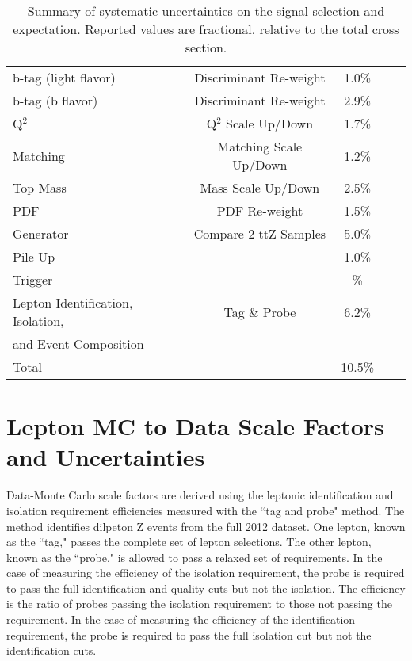 \begin{table}[h]
\begin{center}
\begin{tabular}{lcccc}
b-tag (light flavor)                          & Discriminant Re-weight                              & 1.0\%       	\\
b-tag (b flavor)		                      & Discriminant Re-weight                              & 2.9\%	\\	
Q$^2$                                         & Q$^2$ Scale Up/Down                                 & 1.7\% \\
Matching                                      & Matching Scale Up/Down                              & 1.2\% \\
Top Mass                                      & Mass Scale Up/Down                                  & 2.5\% \\
PDF				                              & PDF Re-weight                                       & 1.5\%	\\
Generator                                     & Compare 2 ttZ Samples                               & 5.0\% \\
Pile Up                                       &                                                     & 1.0\% \\
Trigger                                       &                                                     & \lt 1\% \\
Lepton Identification, Isolation,             & Tag \& Probe                                        & 6.2\% \\
and Event Composition  & & \\
\hline
Total 					                                                                             & & 10.5\% 	\\
\hline
\end{tabular}
\caption{\label{tab:systSumm}Summary of systematic uncertainties on the signal selection and
expectation. 
Reported values are fractional, relative to the total cross section.}
\end{center}
\end{table}

\section{Lepton MC to Data Scale Factors and Uncertainties}
\label{sec:tag_and_probe}

Data-Monte Carlo scale factors are derived using the leptonic identification and isolation requirement efficiencies measured with the ``tag and probe" method. The method identifies dilpeton Z events from the full 2012 dataset. One lepton, known as the ``tag," passes the complete set of lepton selections. The other lepton, known as the ``probe," is allowed to pass a relaxed set of requirements. In the case of measuring the efficiency of the isolation requirement, the probe is required to pass the full identification and quality cuts but not the isolation. The efficiency is the ratio of probes passing the isolation requirement to those not passing the requirement. In the case of measuring the efficiency of the identification requirement, the probe is required to pass the full isolation cut but not the identification cuts. \\

